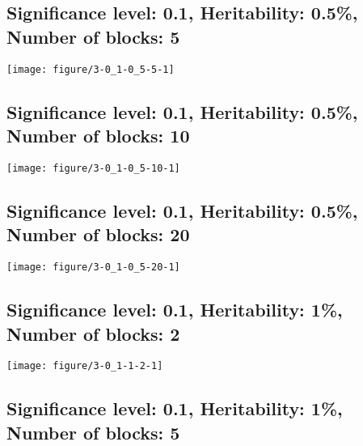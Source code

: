 \documentclass[11pt,letter]{article}\usepackage[]{graphicx}\usepackage[]{color}
\makeatletter
\def\maxwidth{ %
  \ifdim\Gin@nat@width>\linewidth
    \linewidth
  \else
    \Gin@nat@width
  \fi
}
\newenvironment{knitrout}{}{} %
\makeatother
\begin{document}
\newpage
\subsection{Significance level: 0.1, Heritability: 0.5\%, Number of blocks: 5}

\begin{knitrout}
\color{fgcolor}
\texttt{[image: figure/3-0\_1-0\_5-5-1]} 

\end{knitrout}

\newpage
\subsection{Significance level: 0.1, Heritability: 0.5\%, Number of blocks: 10}

\begin{knitrout}
\color{fgcolor}
\texttt{[image: figure/3-0\_1-0\_5-10-1]} 

\end{knitrout}

\newpage
\subsection{Significance level: 0.1, Heritability: 0.5\%, Number of blocks: 20}

\begin{knitrout}
\color{fgcolor}
\texttt{[image: figure/3-0\_1-0\_5-20-1]} 

\end{knitrout}

\newpage
\subsection{Significance level: 0.1, Heritability: 1\%, Number of blocks: 2}

\begin{knitrout}
\color{fgcolor}
\texttt{[image: figure/3-0\_1-1-2-1]} 

\end{knitrout}

\newpage
\subsection{Significance level: 0.1, Heritability: 1\%, Number of blocks: 5}
\end{document}

